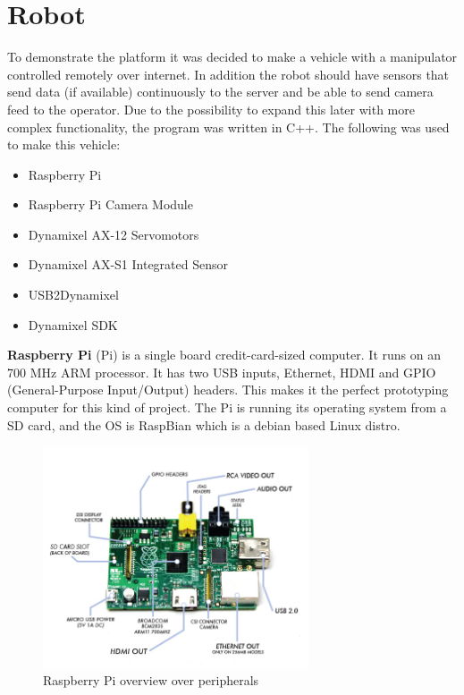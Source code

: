 \section{Robot}
To demonstrate the platform it was decided to make a vehicle with a manipulator controlled remotely over internet. In addition the robot should have sensors that send data (if available) continuously to the server and be able to send camera feed to the operator. Due to the possibility to expand this later with more complex functionality, the program was written in C++.
The following was used to make this vehicle:
\begin{itemize}
    \item Raspberry Pi
    \item Raspberry Pi Camera Module
    \item Dynamixel AX-12 Servomotors
    \item Dynamixel AX-S1 Integrated Sensor
    \item USB2Dynamixel
    \item Dynamixel SDK
\end{itemize}
\vspace{\secspace}

\textbf{Raspberry Pi} (Pi) is a single board credit-card-sized computer. It runs on an 700 MHz ARM processor.
It has two USB inputs, Ethernet, HDMI and GPIO (General-Purpose Input/Output) headers. 
This makes it the perfect prototyping computer for this kind of project. 
The Pi is running its operating system from a SD card, and the OS is RaspBian which is a debian based Linux distro.

\begin{figure}[H]
    \centering
    \includegraphics[width=0.7\textwidth]{graphics/Raspberry_Pi.png}	
    \caption{Raspberry Pi overview over peripherals}
    \label{fig:RPi}
\end{figure}

